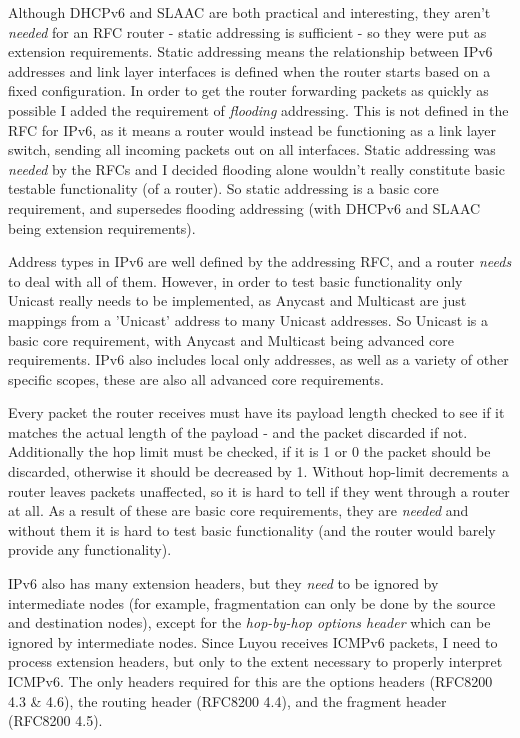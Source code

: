 \documentclass[12pt,a4paper,twoside,openright]{report}
\begin{document}
Although DHCPv6 and SLAAC are both practical and interesting, they aren't \textit{needed} for an RFC router - static addressing is sufficient - so they were put as extension requirements.  Static addressing means the relationship between IPv6 addresses and link layer interfaces is defined when the router starts based on a fixed configuration. In order to get the router forwarding packets as quickly as possible I added the requirement of \textit{flooding} addressing.  This is not defined in the RFC for IPv6, as it means a router would instead be functioning as a link layer switch, sending all incoming packets out on all interfaces. Static addressing was \textit{needed} by the RFCs and I decided flooding alone wouldn't really constitute basic testable functionality (of a router). So static addressing is a basic core requirement, and supersedes flooding addressing (with DHCPv6 and SLAAC being extension requirements).

Address types in IPv6 are well defined by the addressing RFC\cite{ipv6_rfc_adr}, and a router \textit{needs} to deal with all of them.  However, in order to test basic functionality only Unicast really needs to be implemented, as Anycast and Multicast are just mappings from a 'Unicast' address to many Unicast addresses. So Unicast is a basic core requirement, with Anycast and Multicast being advanced core requirements. IPv6 also includes local only addresses, as well as a variety of other specific scopes, these are also all advanced core requirements.

\bigskip

Every packet the router receives must have its payload length checked to see if it matches the actual length of the payload - and the packet discarded if not.  Additionally the hop limit must be checked, if it is 1 or 0 the packet should be discarded, otherwise it should be decreased by 1.  Without hop-limit decrements a router leaves packets unaffected, so it is hard to tell if they went through a router at all. As a result of these are basic core requirements, they are \textit{needed} and without them it is hard to test basic functionality (and the router would barely provide any functionality). 

IPv6 also has many extension headers, but they \textit{need} to be ignored by intermediate nodes (for example, fragmentation can only be done by the source and destination nodes), except for the \textit{hop-by-hop options header} which can be ignored by intermediate nodes. Since Luyou receives ICMPv6 packets, I need to process extension headers, but only to the extent necessary to properly interpret ICMPv6.  The only headers required for this are the options headers (RFC8200 4.3 \& 4.6\cite{ipv6_rfc}), the routing header (RFC8200 4.4\cite{ipv6_rfc}), and the fragment header (RFC8200 4.5\cite{ipv6_rfc}).
\end{document}
